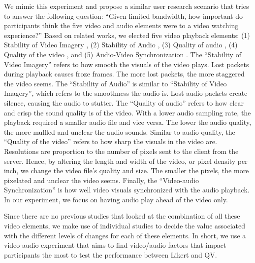 We mimic this experiment and propose a similar user research scenario that tries to answer the following question: ``Given limited bandwidth, how important do participants think the five video and audio elements were to a video watching experience?'' Based on related works, we elected five video playback elements: (1) Stability of Video Imagery \cite{claypool1999effects}, (2) Stability of Audio \cite{claypool1999effects}, (3) Quality of audio \cite{oeldorf2012bad, noll1993wideband}, (4) Quality of the video \cite{oeldorf2012bad, knoche2008low}, and (5) Audio-Video Synchronization \cite{steinmetz1996human}. The ``Stability of Video Imagery'' refers to how smooth the visuals of the video plays. Lost packets during playback causes froze frames. The more lost packets, the more staggered the video seems. The ``Stability of Audio'' is similar to ``Stability of Video Imagery'', which refers to the smoothness the audio is. Lost audio packets create silence, causing the audio to stutter. The ``Quality of audio'' refers to how clear and crisp the sound quality is of the video. With a lower audio sampling rate, the playback required a smaller audio file and vice versa. The lower the audio quality, the more muffled and unclear the audio sounds. Similar to audio quality, the ``Quality of the video'' refers to how sharp the visuals in the video are. Resolutions are proportion to the number of pixels sent to the client from the server. Hence, by altering the length and width of the video, or pixel density per inch, we change the video file's quality and size. The smaller the pixels, the more pixelated and unclear the video seems. Finally, the ``Video-audio Synchronization'' is how well video visuals synchronized with the audio playback. In our experiment, we focus on having audio play ahead of the video only.

Since there are no previous studies that looked at the combination of all these video elements, we make use of individual studies to decide the value associated with the different levels of changes for each of these elements. In short, we use a video-audio experiment that aims to find video/audio factors that impact participants the most to test the performance between Likert and QV.


